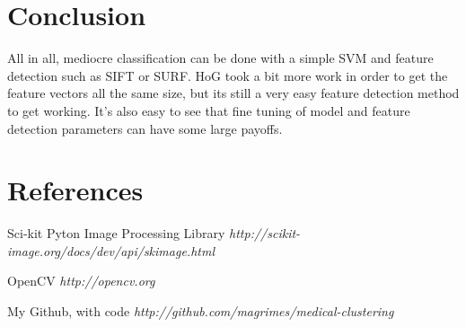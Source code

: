 \documentclass[12pt]{article}
\begin{document}
\section*{Conclusion}
All in all, mediocre classification can be done with a simple SVM and feature detection
such as SIFT or SURF. HoG took a bit more work in order to get the feature vectors
all the same size, but its still a very easy feature detection method to get working.
It's also easy to see that fine tuning of model and feature detection parameters can
have some large payoffs.

\section*{References}

\vspace{0.2in}

Sci-kit Pyton Image Processing Library {\em http://scikit-image.org/docs/dev/api/skimage.html}

\vspace{0.2in}

OpenCV {\em http://opencv.org}

\vspace{0.2in}

My Github, with code {\em http://github.com/magrimes/medical-clustering}
\end{document}
